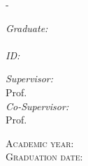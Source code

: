 \begin{titlingpage}
\begin{adjustwidth}{\unitlength}{-\unitlength}
\begin{center}
			\vspace{1cm}
			{\huge{\bfseries{\textcolor{SchoolColor}{\Title}}} \par}\vspace{0.7cm} %
			\vspace{1cm}

			\begin{minipage}[t]{0.3\textwidth}
				\begin{flushleft} \large
					\emph{Graduate:}\\
					\textcolor{SchoolColor}{\AuthorName \ \textsc{\AuthorSurname}} %
					\\
					\emph{ID:} \textsc{\StudentId}
				\end{flushleft}
			\end{minipage}
			\begin{minipage}[t]{0.68\textwidth}
				\begin{flushright} \large
					\emph{Supervisor:} \\
					\textcolor{SchoolColor}{Prof. \SupName \ \textsc{\SupSurname}} %
					\vspace{10pt}\\
					\emph{Co-Supervisor:} \\
					\textcolor{SchoolColor}{Prof. \CosupName \ \textsc{\CosupSurname}} %
				\end{flushright}
			\end{minipage}

			\vfill
			\large{\textsc{Academic year:} \quad \AcademicYear}\\
			\large{\textsc{Graduation date:} \quad \GraduationDate}
		\end{center}
	\end{adjustwidth}
\end{titlingpage}
